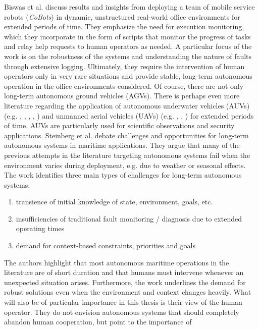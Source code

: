 \documentclass[english, master, utf8]{base/thesis_KBS}
\begin{document}
Biswas et al. \cite{Biswas:2016} discuss results and insights from deploying a team of mobile service robots (\textit{CoBots}) in dynamic, unstructured real-world office environments
for extended periods of time. They emphasize the need for execution monitoring, which they incorporate in the form of scripts that monitor the progress of tasks and relay help
requests to human operators as needed. A particular focus of the work is on the robustness of the systems and understanding the nature of faults through extensive logging.
Ultimately, they require the intervention of human operators only in very rare situations and provide stable, long-term autonomous operation in the office environments considered.
\newline
Of course, there are not only long-term autonomous ground vehicles (AGVs). There is perhaps even more literature regarding the application of autonomous underwater vehicles (AUVs)
(e.g. \cite{Jones:2012}, \cite{Spears:2014}, \cite{Kunz:2009}, \cite{Chrpa:2015}, \cite{Harris:2021}) and unmanned aerial vehicles (UAVs) (e.g. \cite{Brommer:2018}, \cite{Dong:2014},
\cite{Dong:2017}) for extended periods of time. AUVs are particularly used for scientific observations and security applications. \cite{Chrpa:2015}
Steinberg et al. \cite{Steinberg:2016} debate challenges and opportunities for long-term autonomous systems in
maritime applications. They argue that many of the previous attempts in the literature targeting autonomous systems fail when the environment varies during deployment, e.g.
due to weather or seasonal effects. The work identifies three main types of challenges for long-term autonomous systems:
\begin{enumerate}
    \item transience of initial knowledge of state, environment, goals, etc.
    \item insufficiencies of traditional fault monitoring / diagnosis due to extended operating times
    \item demand for context-based constraints, priorities and goals
\end{enumerate}
The authors highlight that most autonomous maritime operations in the literature are of short duration and that humans must intervene whenever an unexpected situation arises. 
Furthermore, the work underlines the demand for robust solutions even when the environment and context changes heavily. What will also be of particular importance
in this thesis is their view of the human operator. They do not envision autonomous systems that should completely abandon human cooperation, but point to the importance of
\end{document}
